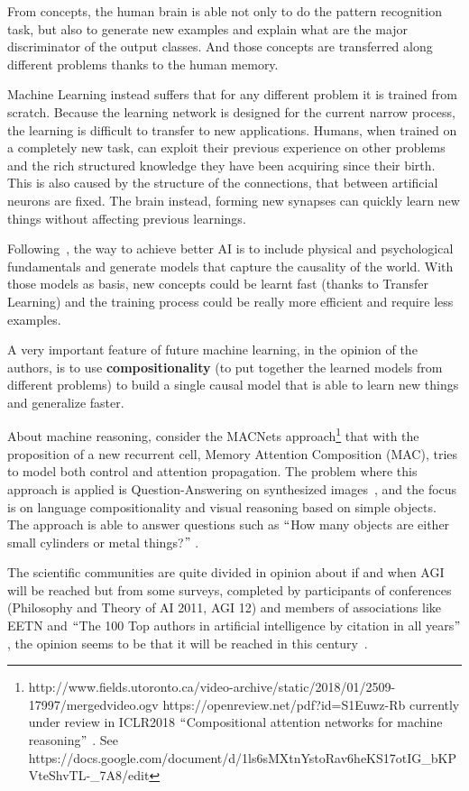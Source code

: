 From concepts, the human brain is able not only to do the pattern recognition task, but also to generate new examples and explain what are the major discriminator of the output classes. And those concepts are transferred along different problems thanks to the human memory.

Machine Learning instead suffers that for any different problem it is trained from scratch. Because the learning network is designed for the current narrow process, the learning is difficult to transfer to new applications. Humans, when trained on a completely new task, can exploit their previous experience on other problems and the rich structured knowledge they have been acquiring since their birth. This is also caused by the structure of the connections, that between artificial neurons are fixed. The brain instead, forming new synapses can quickly learn new things without affecting previous learnings.~\cite{hawkins2016neurons}

Following~\cite{pearl2018theoretical}, the way to achieve better AI is to include physical and psychological fundamentals and generate models that capture the causality of the world. With those models as basis, new concepts could be learnt fast (thanks to Transfer Learning) and the training process could be really more efficient and require less examples.

A very important feature of future machine learning, in the opinion of the authors, is to use \textbf{compositionality} (to put together the learned models from different problems) to build a single causal model that is able to learn new things and generalize faster.

About machine reasoning, consider the MACNets approach\footnote{ http://www.fields.utoronto.ca/video-archive/static/2018/01/2509-17997/mergedvideo.ogv https://openreview.net/pdf?id=S1Euwz-Rb currently under review in ICLR2018 $``$Compositional attention networks for machine reasoning$"$ . See https://docs.google.com/document/d/1ls6sMXtnYstoRav6heKS17otIG\_bKPVteShvTL-\_7A8/edit  } that with the proposition of a new recurrent cell, Memory Attention Composition (MAC), tries to model both control and attention propagation. The problem where this approach is applied is Question-Answering on synthesized images~\cite{johnson2017clevr}, and the focus is on language compositionality and visual reasoning based on simple objects. The approach is able to answer questions such as $``$How many objects are either small cylinders or metal things?$"$ .

The scientific communities are quite divided in opinion about if and when AGI will be reached but from some surveys, completed by participants of conferences (Philosophy and Theory of AI 2011, AGI 12) and members of associations like EETN and $``$The 100 Top authors in artificial intelligence by citation in all years$"$ , the opinion seems to be that it will be reached in this century~\cite{muller2016future}.

